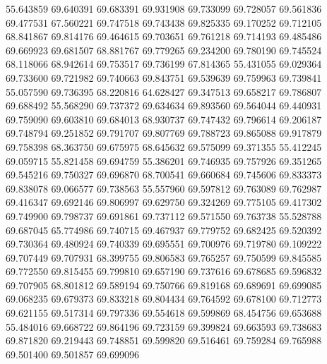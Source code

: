 55.643859
69.640391
69.683391
69.931908
69.733099
69.728057
69.561836
69.477531
67.560221
69.747518
69.743438
69.825335
69.170252
69.712105
68.841867
69.814176
69.464615
69.703651
69.761218
69.714193
69.485486
69.669923
69.681507
68.881767
69.779265
69.234200
69.780190
69.745524
68.118066
68.942614
69.753517
69.736199
67.814365
55.431055
69.029364
69.733600
69.721982
69.740663
69.843751
69.539639
69.759963
69.739841
55.057590
69.736395
68.220816
64.628427
69.347513
69.658217
69.786807
69.688492
55.568290
69.737372
69.634634
69.893560
69.564044
69.440931
69.759090
69.603810
69.684013
68.930737
69.747432
69.796614
69.206187
69.748794
69.251852
69.791707
69.807769
69.788723
69.865088
69.917879
69.758398
68.363750
69.675975
68.645632
69.575099
69.371355
55.412245
69.059715
55.821458
69.694759
55.386201
69.746935
69.757926
69.351265
69.545216
69.750327
69.696870
68.700541
69.660684
69.745606
69.833373
69.838078
69.066577
69.738563
55.557960
69.597812
69.763089
69.762987
69.416347
69.692146
69.806997
69.629750
69.324269
69.775105
69.417302
69.749900
69.798737
69.691861
69.737112
69.571550
69.763738
55.528788
69.687045
65.774986
69.740715
69.467937
69.779752
69.682425
69.520392
69.730364
69.480924
69.740339
69.695551
69.700976
69.719780
69.109222
69.707449
69.707931
68.399755
69.806583
69.765257
69.750599
69.845585
69.772550
69.815455
69.799810
69.657190
69.737616
69.678685
69.596832
69.707905
68.801812
69.589194
69.750766
69.819168
69.689691
69.699085
69.068235
69.679373
69.833218
69.804434
69.764592
69.678100
69.712773
69.621155
69.517314
69.797336
69.554618
69.599869
68.454756
69.653688
55.484016
69.668722
69.864196
69.723159
69.399824
69.663593
69.738683
69.871820
69.219443
69.748851
69.599820
69.516461
69.759284
69.765988
69.501400
69.501857
69.699096
